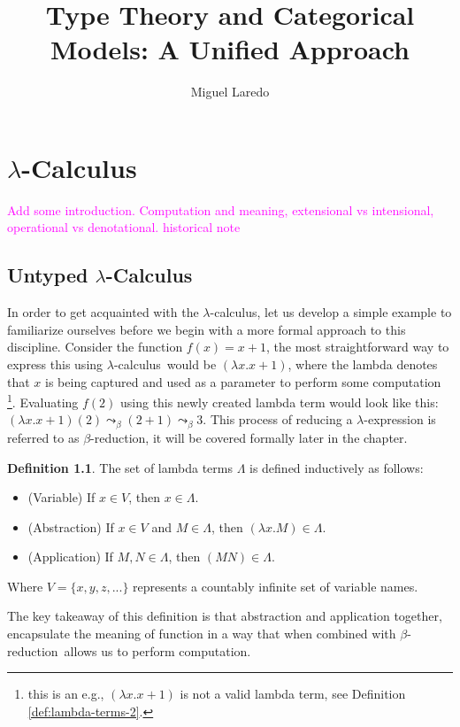 \documentclass[12pt]{book}
\title{Type Theory and Categorical Models: A Unified Approach}
\author{Miguel Laredo}
\newcommand{\la}{\lambda}
\newcommand{\La}{\Lambda}
\newcommand{\Vset}{V}
\newcommand{\lCalc}{$\la$-Calculus}
\newcommand{\lcalc}{$\la$-calculus}
\newcommand{\bred}{$\beta$-reduction}
\newcommand{\magenta}[1]{\textcolor{magenta}{#1}}
\newcommand{\curly}{\mathrel{\leadsto}_\beta}
\theoremstyle{plain}
\theoremstyle{definition}
\newtheorem{definition}{Definition}[section]
\theoremstyle{definition}
\theoremstyle{definition}
\begin{document}
\chapter{\lCalc}

\magenta{Add some introduction. Computation and meaning, extensional vs intensional, operational vs denotational. historical note}

\section{\centering Untyped \lCalc}
In order to get acquainted with the \lcalc, let us develop a simple example to familiarize ourselves before we begin with a more formal approach to this discipline. Consider the function $f(x) = x + 1$, the most straightforward way to express this using \lcalc \ would be $(\la x . x + 1 )$, where the lambda denotes that $x$ is being captured and used as a parameter to perform some computation \footnote{this is an e.g., $(\la x . x + 1 )$ is not a valid lambda term, see Definition \ref{def:lambda-terms-2}.}. Evaluating $f(2)$ using this newly created lambda term would look like this: $(\la x . x + 1)(2) \curly (2 + 1) \curly 3$. This process of reducing a $\la$-expression is referred to as \bred, it will be covered formally later in the chapter.
\begin{definition} The set of lambda terms \( \La \) is defined inductively as follows:
  \label{def:lambda-terms-1}
  \begin{itemize}
  \item (Variable) If \( x \in \Vset \), then \( x \in \La \).  
  \item (Abstraction) If \( x \in \Vset \) and \( M \in \La \), then \( (\la x. M) \in \La \).
  \item (Application) If \( M, N \in \La \), then \((M N) \in \La \).
  \end{itemize}
  Where $\Vset = \{x, y, z, ... \}$ represents a countably infinite set of variable names.
\end{definition}
The key takeaway of this definition is that abstraction and application together, encapsulate the meaning of function in a way that when combined with \bred \ allows us to perform computation.
\end{document}
